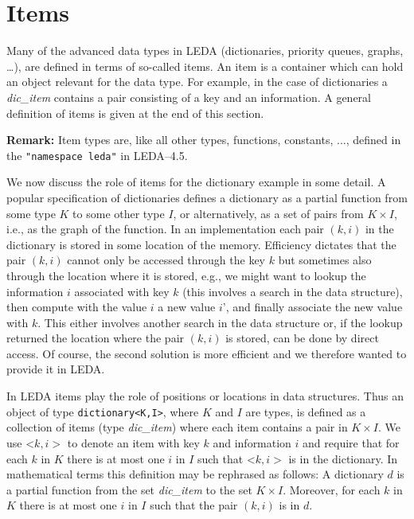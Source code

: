 \section{Items}

\label{Items}
Many of the advanced data types in LEDA (dictionaries, priority queues, 
graphs, \dots), are defined in terms of so-called items. 
An item is a container which can hold an object
relevant for the data type. For example, in the case of dictionaries a
{\it dic\_item} contains a pair consisting of a key and an information.
A general definition of items is given at the end of this section. 

{\bf Remark:} Item types are, like  all other types, functions,
constants, ..., defined in the \texttt{"namespace leda"} in LEDA--4.5. 

We now discuss the role of items for the dictionary example in some detail. 
A popular specification of dictionaries defines a dictionary as a partial
function from some type $K$ to some other type $I$, or alternatively, as a
set of pairs from $K \times I$, i.e., as the graph of the function. In an
implementation each pair $(k,i)$ in the dictionary is stored in some location
of the memory. Efficiency dictates that the pair $(k,i)$ cannot only be
accessed through the key $k$ but sometimes also through the location where it
is stored, e.g., we might want to lookup the information $i$ associated with
key $k$ (this involves a search in the data structure), then compute with the
value $i$ a new value $i$', and finally associate the new value with $k$.
This either involves another search in the data structure or, if the lookup
returned the location where the pair $(k,i)$ is stored, can be done by direct
access. Of course, the second solution is more efficient and we therefore
wanted to provide it in LEDA.

In LEDA items play the role of positions or locations in data structures. Thus
an object of type \texttt{dictionary<K,I>}, where $K$ and $I$ are types, is
defined as a collection of items (type {\it dic\_item}) where each item
contains a pair in $K \times I$. We use <$k,i>$ to denote an item with key
$k$ and information $i$ and require that for each $k$ in $K$ there is at most
one $i$ in $I$ such that <$k,i>$ is in the dictionary. In mathematical terms
this definition may be rephrased as follows: A dictionary $d$ is a partial
function from the set {\it dic\_item} to the set $K \times I$. Moreover, 
for each $k$ in $K$ there is at most one $i$ in $I$ such that the pair 
$(k,i)$ is in $d$.

